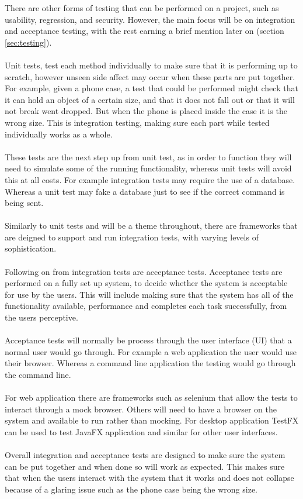 There are other forms of testing that can be performed on a project, such as usability, regression,  and security. However, the main focus will be on integration and acceptance testing, with the rest earning a brief mention later on (section \ref{sec:testing}). 
\\\\
Unit tests, test each method individually to make sure that it is performing up to scratch, however unseen side affect may occur when these parts are put together. For example, given a phone case, a test that could be performed might check that it can hold an object of a certain size, and that it does not fall out or that it will not break went dropped. But when the phone is placed inside the case it is the wrong size. This is integration testing, making sure each part while tested individually works as a whole.
\\\\
These tests are the next step up from unit test, as in order to function they will need to simulate some of the running functionality, whereas unit tests will avoid this at all costs. For example integration tests may require the use of a database. Whereas a unit test may fake a database just to see if the correct command is being sent.
\\\\ 
Similarly to unit tests and will be a theme throughout, there are frameworks that are deigned to support and run integration tests, with varying levels of sophistication.
\\\\
Following on from integration tests are acceptance tests. Acceptance tests are performed on a fully set up system, to decide whether the system is acceptable for use by the users. This will include making sure that the system has all of the functionality available, performance and completes each task successfully, from the users perceptive.
\\\\
Acceptance tests will normally be process through the user interface (UI) that a normal user would go through. For example a web application the user would use their browser. Whereas a command line application the testing would go through the command line.
\\\\
For web application there are frameworks such as selenium that allow the tests to interact through a mock browser. Others will need to have a browser on the system and available to run rather than mocking. For desktop application TestFX can be used to test JavaFX application and similar for other user interfaces.
\\\\
Overall integration and acceptance tests are designed to make sure the system can be put together and when done so will work as expected. This makes sure that when the users interact with the system that it works and does not collapse because of a glaring issue such as the phone case being the wrong size.

